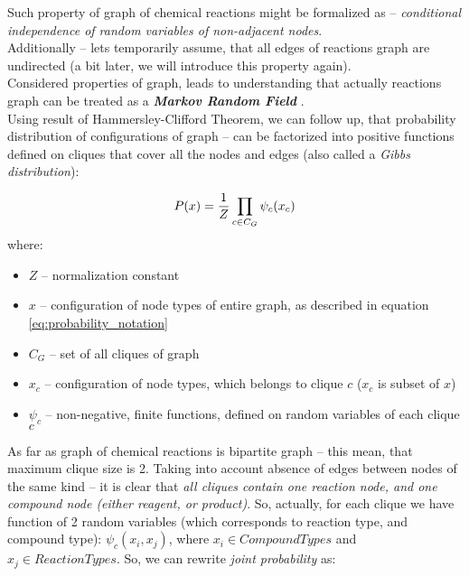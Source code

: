 \documentclass[10pt]{article}
\begin{document}
Such property of graph of chemical reactions might be formalized as -- \emph{conditional independence of random variables of non-adjacent nodes}. \\

Additionally -- lets temporarily assume, that all edges of reactions graph are undirected (a bit later, we will introduce this property again). \\

Considered properties of graph, leads to understanding that actually reactions graph can be treated as a \emph{\textbf{Markov Random Field}} \cite{wikipedia_mrf}.
\\

Using result of Hammersley-Clifford Theorem, we can follow up, that probability distribution of configurations of graph -- can be factorized into positive functions defined on cliques that cover all the nodes and edges (also called a \emph{Gibbs distribution})\cite{hammersley_clifford_proof, wikipedia_hammersley_clifford}:

\begin{equation}
P(x) = {1 \over Z} \prod_{c \in C_G} \psi_{c}(x_c)
\end{equation}
where:
\begin{itemize} 
    \setlength \itemsep{0em}
    \item $Z$ -- normalization constant
    \item $x$ -- configuration of node types of entire graph, as described in equation \eqref{eq:probability_notation}
    \item $C_G$ -- set of all cliques of graph
    \item $x_c$ -- configuration of node types, which belongs to clique $c$ ($x_c$ is subset of $x$)
    \item $\psi_{c}$ -- non-negative, finite functions, defined on random variables of each clique $c$
\end{itemize}

\noindent As far as graph of chemical reactions is bipartite graph -- this mean, that maximum clique size is 2. Taking into account absence of edges between nodes of the same kind -- it is clear that \emph{all cliques contain one reaction node, and one compound node (either reagent, or product)}. So, actually, for each clique we have function of 2 random variables (which corresponds to reaction type, and compound type): $\psi_c(x_i, x_j)$, where $x_i \in CompoundTypes$ and $x_j \in ReactionTypes$. So, we can rewrite \emph{joint probability} as:
\end{document}
